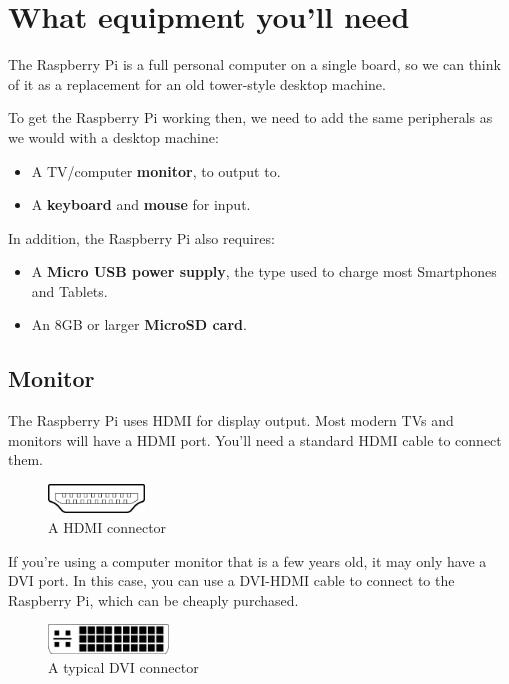 \section{What equipment you'll need}
\label{sec:PiEquiptment}

	The Raspberry Pi is a full personal computer on a single board, so we can think of it as a replacement for an old tower-style desktop machine.
	
	To get the Raspberry Pi working then, we need to add the same peripherals as we would with a desktop machine:
	
	\begin{itemize}[nosep]
		\item A TV/computer \textbf{monitor}, to output to.
		\item A \textbf{keyboard} and \textbf{mouse} for input.
	\end{itemize}
		
	In addition, the Raspberry Pi also requires:
	\begin{itemize}[nosep]
		\item A \textbf{Micro USB power supply}, the type used to charge most Smartphones and Tablets.
		\item An 8GB or larger \textbf{MicroSD card}.
	\end{itemize}
	
	\subsection*{Monitor}
	
		The Raspberry Pi uses HDMI for display output. Most modern TVs and monitors will have a HDMI port. You'll need a standard HDMI cable to connect them.
		
		\begin{figure}[h]
			\centering
			\includegraphics[height=22pt]{McrRaspJam/000_IntroToPi/1_EquipmentNeeded/HDMI}
			\\A HDMI connector
		\end{figure}
		
		If you're using a computer monitor that is a few years old, it may only have a DVI port. In this case, you can use a DVI-HDMI cable to connect to the Raspberry Pi, which can be cheaply purchased.
	
		\begin{figure}[h]
			\centering
			\includegraphics[height=22pt]{McrRaspJam/000_IntroToPi/1_EquipmentNeeded/DVI}
			\\A typical DVI connector
		\end{figure}
		
